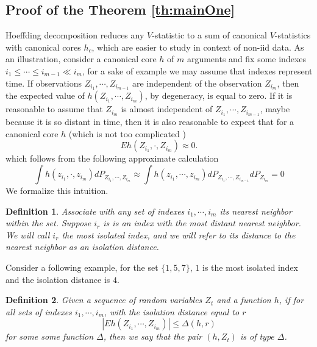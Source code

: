\documentclass{article} %
\newtheorem{definition}{Definition}
\newcommand{\ev}{E}
\begin{document}
\subsection{Proof of the Theorem   \ref{th:mainOne}} 
\label{sec:prMainOne}

Hoeffding decomposition reduces any $V$-statistic to a sum of canonical $V$-statistics with canonical cores $h_c$, which are easier to study in context of  non-iid data. As an illustration, consider a canonical core $h$ of $m$ arguments and fix some indexes  $i_1 \leq  \cdots \leq i_{m-1} \ll i_m $, for a sake of  example we may assume that indexes represent time. If observations $Z_{i_1}, \cdots, Z_{i_{m-1}}$ are independent of the observation $Z_{i_m}$, then the expected value of $h(Z_{i_1}, \cdots, Z_{i_m})$, by degeneracy, is equal to zero. If it is reasonable to assume that $Z_{i_m}$ is almost independent of $Z_{i_1}, \cdots, Z_{i_{m-1}}$, maybe because it is so distant in time, then it is also reasonable to expect that for a canonical core $h$ (which is not too complicated ) 
\[
 \ev h(Z_{i_1}, \cdot, Z_{i_m}) \approx 0.
\]
which follows from the following approximate calculation
\[
 \int h(z_{i_1}, \cdot, z_{i_m}) dP_{Z_{i_1}, \cdots, Z_{i_m}} \approx  \int h(z_{i_1}, \cdots, z_{i_m}) dP_{Z_{i_1}, \cdots, Z_{i_{m-1}}} dP_{Z_{i_m}} =0
\]
We formalize this intuition.
\begin{definition}
 Associate with  any  set of indexes $ i_1,\cdots,i_m$ its nearest neighbor within the set. Suppose $i_r$ is is an index with the most distant nearest neighbor. We will call $i_r$ the most isolated index, and we will refer to its distance to the nearest neighbor as an isolation distance.
\end{definition}
Consider a following example, for the set $\{1,5,7\}$, $1$ is the most isolated index and the isolation distance is $4$.
\begin{definition}
\label{isolation}
\label{def:varDelta}
 Given a sequence of random variables $Z_{t} $ and a function $h$, if for all sets of indexes $i_1,\cdots,i_m$, with the isolation distance equal to $r$ 
 \[
  |E h(Z_{i_1}, \cdots, Z_{i_m})| \leq \varDelta(h,r)
 \]
 for some some function $\varDelta$, then we say that the pair $(h,Z_{t})$ is of type $\varDelta$. 
\end{definition}
\end{document}
